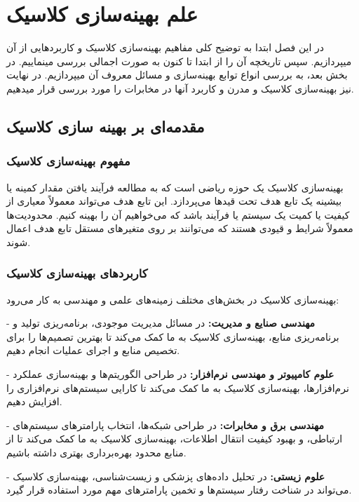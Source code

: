 \chapter{علم بهینه‌سازی کلاسیک}
در این فصل ابتدا به توضیح کلی مفاهیم بهینه‌سازی کلاسیک و کاربرد‌هایی از آن میپردازیم. سپس تاریخچه آن را از ابتدا تا کنون به صورت اجمالی بررسی مینماییم. در بخش بعد، به بررسی انواع توابع بهینه‌سازی و مسائل معروف آن میپردازیم. در نهایت نیز بهینه‌سازی کلاسیک و مدرن و کاربرد آنها در مخابرات را مورد بررسی قرار میدهیم.
\newpage
\section{
مقدمه‌ای بر بهینه سازی کلاسیک
}

\subsection{مفهوم بهینه‌سازی کلاسیک}

بهینه‌سازی کلاسیک یک حوزه ریاضی است که به مطالعه فرآیند یافتن مقدار کمینه یا بیشینه یک تابع هدف تحت قیدها می‌پردازد. این تابع هدف می‌تواند معمولاً معیاری از کیفیت یا کمیت یک سیستم یا فرآیند باشد که می‌خواهیم آن را بهینه کنیم. محدودیت‌ها معمولاً شرایط و قیودی هستند که می‌توانند بر روی متغیرهای مستقل تابع هدف اعمال شوند.

\subsection{کاربردهای بهینه‌سازی کلاسیک}

بهینه‌سازی کلاسیک در بخش‌های مختلف زمینه‌های علمی و مهندسی به کار می‌رود:

- \textbf{مهندسی صنایع و مدیریت:} در مسائل مدیریت موجودی، برنامه‌ریزی تولید و برنامه‌ریزی منابع، بهینه‌سازی کلاسیک به ما کمک می‌کند تا بهترین تصمیم‌ها را برای تخصیص منابع و اجرای عملیات انجام دهیم.

- \textbf{علوم کامپیوتر و مهندسی نرم‌افزار:} در طراحی الگوریتم‌ها و بهینه‌سازی عملکرد نرم‌افزارها، بهینه‌سازی کلاسیک به ما کمک می‌کند تا کارایی سیستم‌های نرم‌افزاری را افزایش دهیم.

- \textbf{مهندسی برق و مخابرات:} در طراحی شبکه‌ها، انتخاب پارامترهای سیستم‌های ارتباطی، و بهبود کیفیت انتقال اطلاعات، بهینه‌سازی کلاسیک به ما کمک می‌کند تا از منابع محدود بهره‌برداری بهتری داشته باشیم.

- \textbf{علوم زیستی:} در تحلیل داده‌های پزشکی و زیست‌شناسی، بهینه‌سازی کلاسیک می‌تواند در شناخت رفتار سیستم‌ها و تخمین پارامترهای مهم مورد استفاده قرار گیرد.

